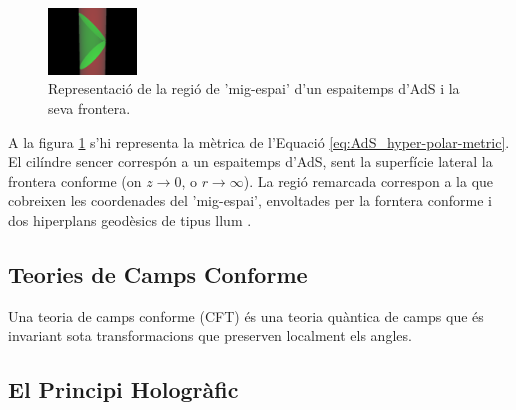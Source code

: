 \documentclass[lettersize,journal]{IEEEtran}
\begin{document}
\begin{figure}
    \centering
    \includegraphics[width=0.21\textwidth]{../../Imatges/Wikipedia_Half-space_Cilindric.png}
\caption{Representació de la regió de 'mig-espai' d'un espaitemps d'AdS i la seva frontera.}
\label{fig:AdS_cylindrical}
\end{figure}

A la figura \ref{fig:AdS_cylindrical} s'hi representa la mètrica de l'Equació \ref{eq:AdS_hyper-polar-metric}. El cilíndre sencer correspón a un espaitemps d'AdS, sent la superfície lateral la frontera conforme (on $z \to 0$, o $r \to \infty$). La regió remarcada correspon a la que cobreixen les coordenades del 'mig-espai', envoltades per la forntera conforme i dos hiperplans geodèsics de tipus llum \cite{}.


\subsection{Teories de Camps Conforme}

Una teoria de camps conforme (CFT) és una teoria quàntica de camps que és invariant sota transformacions que preserven localment els angles.


\subsection{El Principi Hologràfic}
\end{document}
